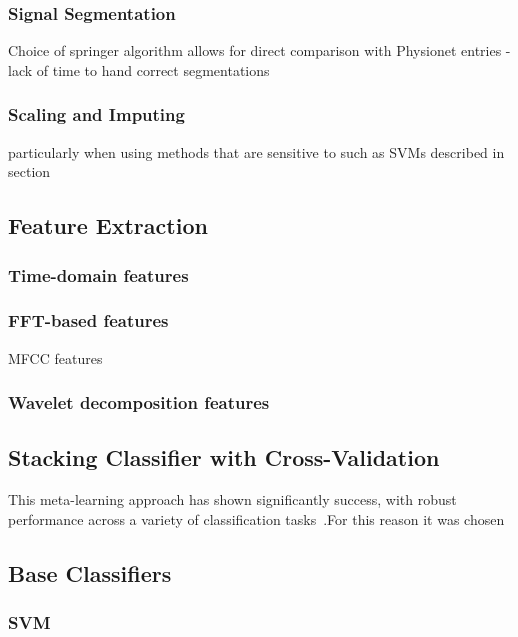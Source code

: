 \documentclass[titlepage, 12pt]{scrartcl} \usepackage{enumitem}
\begin{document}
\subsubsection{Signal Segmentation}
Choice of springer algorithm allows for direct comparison with Physionet
entries
- lack of time to hand correct segmentations

\subsubsection{Scaling and Imputing}
particularly when using methods
that are sensitive to such as SVMs described in section

\subsection{Feature Extraction}\label{featEx}

\subsubsection{Time-domain features}

\subsubsection{FFT-based features}
MFCC features

\subsubsection{Wavelet decomposition features}

\subsection{Stacking Classifier with Cross-Validation}\label{class}
This meta-learning approach
has shown significantly success, with robust performance across a variety of classification
tasks~\parencite[p.498]{Tobergte2013a}.For this reason it was chosen

\subsection{Base Classifiers}

\subsubsection{SVM}
\end{document}
